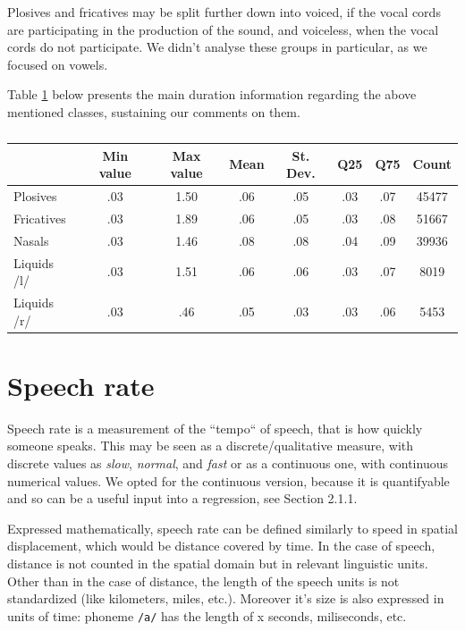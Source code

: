 \documentclass[11pt,a4paper]{scrbook}
\begin{document}
Plosives and fricatives may be split further down into voiced, if the vocal cords are participating in the production of the sound, and voiceless, when the vocal cords do not participate. We didn't analyse these groups in particular, as we focused on vowels. 

Table \ref{tab:cons_stats} below presents the main duration information regarding the above mentioned classes, sustaining our comments on them.
\begin{table}[htbp]
\centering
\begin{tabular}{|l|c|c|c|c|c|c|c|}

\hline
	 & Min value & Max value & Mean & St. Dev. & Q25 & Q75 & Count\\
\hline
\hline
Plosives  	& .03  & 1.50 & .06 & .05 & .03 & .07 & 45477\\
	\hline
Fricatives   & .03 & 1.89 &  .06 & .05 & .03 & .08 & 51667\\
	\hline
Nasals  &  .03 & 1.46 & .08 & .08 & .04 & .09 & 39936 \\
	\hline
Liquids /l/ & .03 & 1.51 & .06 & .06 & .03 & .07 & 8019 \\
	\hline
Liquids /r/ & .03 & .46 & .05 & .03 &  .03 & .06 & 5453 \\
	\hline
\end{tabular}
\caption{} 
\label{tab:cons_stats}
\end{table}

\chapter{Speech rate}
Speech rate is a measurement of the ``tempo`` of speech, that is how quickly someone speaks. This may be seen as a discrete/qualitative measure, with discrete values as \textit{slow}, \textit{normal}, and \textit{fast} or as a continuous one, with continuous numerical values.  We opted for the continuous version, because it is quantifyable and so can be a useful input into a regression, see Section 2.1.1.

Expressed mathematically, speech rate can be defined similarly to speed in spatial displacement, which would be distance covered by time. In the case of speech, distance is not counted in the spatial domain but in relevant linguistic units. Other than in the case of distance, the length of the speech units is not standardized (like kilometers, miles, etc.). Moreover it's size is also expressed in units of time: phoneme \texttt{/a/} has the length of x seconds, miliseconds, etc. 
\end{document}
